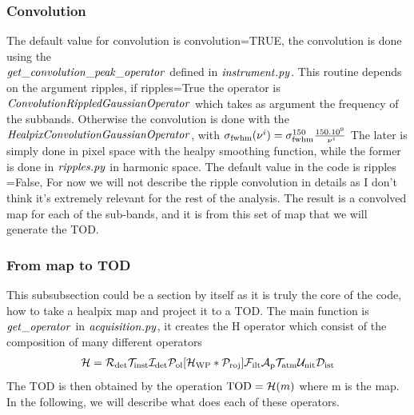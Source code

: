\documentclass[a4paper, 11pt]{article}
\def\ba{\begin{eqnarray}}
\def\ea{\end{eqnarray}}
\begin{document}
\subsubsection{Convolution}

The default value for convolution is convolution=TRUE, the convolution is done using the \\ $\it{get\_convolution\_peak\_operator}$ defined in $\it{instrument.py}$.
This routine depends on the argument ripples, if ripples=True the operator is  $\it{ConvolutionRippledGaussianOperator}$ which takes as argument the frequency of the subbands. Otherwise the convolution is done with the $\it{HealpixConvolutionGaussianOperator}$, with  $\sigma_{\rm fwhm}(\nu^{i})= \sigma^{150}_{\rm fwhm} \frac{150 . 10^{9}}{ \nu^{i}}$
The later is simply done in pixel space with the healpy smoothing function, while the former is done in $\it{ripples.py}$ in harmonic space.
The default value in the code is ripples =False, For now we will not describe the ripple convolution in details as I don't think it's extremely relevant for the rest of the analysis.
The result is a convolved map for each of the sub-bands, and it is from this set of map that we will generate the TOD.

\subsubsection{From map to TOD}

This subsubsection could be a section by itself as it is truly the core of the code, how to take a healpix map and project it to a TOD.
The main function is $\it{get\_operator}$ in $\it{acquisition.py}$, it creates the H operator which consist of the composition of many different operators
\ba
{\cal H}=  {\cal R}_{\rm det}  {\cal T}_{\rm inst}   {\cal I}_{\rm det}  {\cal P}_{\rm ol} [{\cal H}_{\rm WP} * {\cal P}_{\rm roj}]  {\cal F}_{\rm ilt}  {\cal A}_{\rm p}  {\cal T}_{\rm atm}  {\cal U}_{\rm nit}   {\cal D}_{\rm ist}
\ea 
The TOD is then obtained by the operation ${\rm TOD}= {\cal H}(m)$ where m is the map.
In the following, we will describe what does each of these operators.
\end{document}
